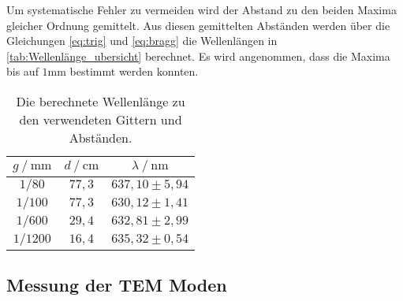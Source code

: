 Um systematische Fehler zu vermeiden wird der Abstand zu den beiden Maxima gleicher Ordnung gemittelt. 
Aus diesen gemittelten Abständen werden über die Gleichungen \eqref{eq:trig} und \eqref{eq:bragg} die Wellenlängen in \autoref{tab:Wellenlänge_ubersicht} berechnet. 
Es wird angenommen, dass die Maxima bis auf $1 \unit{\milli\meter}$ bestimmt werden konnten.

\begin{table}[H]
    \centering
    \caption{Die berechnete Wellenlänge zu den verwendeten Gittern und Abständen.}
    \label{tab:Wellenlänge_ubersicht}
    \begin{tabular}{c c c}
    \toprule
     $g \mathbin{/} \unit{\milli\meter}$ & $d \mathbin{/} \unit{\centi\meter}$ &$\lambda \mathbin{/} \unit{\nano\meter}$ \\
    \midrule
    $1/80  $   & $77,3$   & $637,10 \pm 5,94$\\
    $1/100 $   & $77,3$   & $630,12 \pm 1,41$\\
    $1/600 $   & $29,4$   & $632,81 \pm 2,99$\\
    $1/1200$   & $16,4$   & $635,32 \pm 0,54$\\
    \bottomrule
    \end{tabular}
    \end{table}

\subsection{Messung der TEM Moden}
\label{sec:TEM_moden}